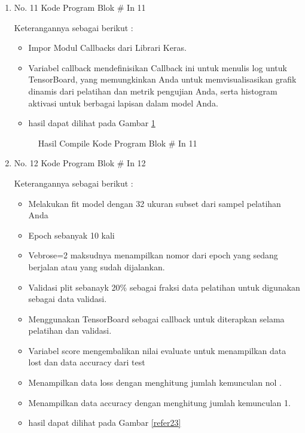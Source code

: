 \begin{enumerate}
\item No. 11 Kode Program Blok \# In 11
\par 
Keterangannya sebagai berikut :
\begin{itemize}
\item Impor Modul Callbacks dari Librari Keras.
\item Variabel callback mendefinisikan Callback ini untuk menulis log untuk TensorBoard, yang memungkinkan Anda untuk memvisualisasikan grafik dinamis dari pelatihan dan metrik pengujian Anda, serta histogram aktivasi untuk berbagai lapisan dalam model Anda.
\item hasil dapat dilihat pada Gambar \ref{refer22}
\end{itemize}

\begin{figure}[!htbp]
      \caption{Hasil Compile Kode Program Blok \# In 11}
      \label{refer22}
\end{figure}

\item No. 12 Kode Program Blok \# In 12
\par 
Keterangannya sebagai berikut :
\begin{itemize}
\item Melakukan fit model dengan 32 ukuran subset dari sampel pelatihan Anda
\item Epoch sebanyak 10 kali
\item Vebrose=2 maksudnya menampilkan nomor dari epoch yang sedang berjalan atau yang sudah dijalankan.
\item Validasi plit sebanayk 20\% sebagai fraksi data pelatihan untuk digunakan sebagai data validasi.
\item Menggunakan TensorBoard sebagai callback untuk diterapkan selama pelatihan dan validasi.
\item Variabel score mengembalikan nilai evaluate untuk menampilkan data lost dan data accuracy dari test
\item Menampilkan data loss dengan menghitung jumlah kemunculan nol .
\item Menampilkan data accuracy dengan menghitung jumlah kemunculan 1.
\item hasil dapat dilihat pada Gambar \ref{refer23}
\end{itemize}


\end{enumerate}
